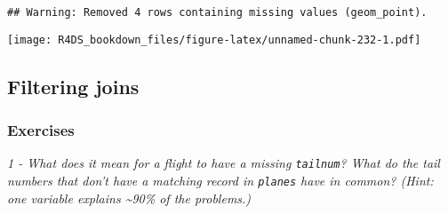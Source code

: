 \documentclass[]{article}
\newenvironment{Shaded}{\begin{snugshade}}{\end{snugshade}}
\newcommand{\KeywordTok}[1]{\textcolor[rgb]{0.13,0.29,0.53}{\textbf{#1}}}
\newcommand{\DataTypeTok}[1]{\textcolor[rgb]{0.13,0.29,0.53}{#1}}
\newcommand{\DecValTok}[1]{\textcolor[rgb]{0.00,0.00,0.81}{#1}}
\newcommand{\StringTok}[1]{\textcolor[rgb]{0.31,0.60,0.02}{#1}}
\newcommand{\OtherTok}[1]{\textcolor[rgb]{0.56,0.35,0.01}{#1}}
\newcommand{\OperatorTok}[1]{\textcolor[rgb]{0.81,0.36,0.00}{\textbf{#1}}}
\newcommand{\NormalTok}[1]{#1}
\theoremstyle{definition}
\theoremstyle{definition}
\theoremstyle{definition}
\theoremstyle{remark}
\begin{document}
\begin{Shaded}
\end{Shaded}

\begin{verbatim}
## Warning: Removed 4 rows containing missing values (geom_point).
\end{verbatim}

\texttt{[image: R4DS\_bookdown\_files/figure-latex/unnamed-chunk-232-1.pdf]}

\subsection{Filtering joins}\label{filtering-joins}

\subsubsection{Exercises}\label{exercises-29}

\emph{1 - What does it mean for a flight to have a missing
\texttt{tailnum}? What do the tail numbers that don't have a matching
record in \texttt{planes} have in common? (Hint: one variable explains
\textasciitilde{}90\% of the problems.)}
\end{document}
